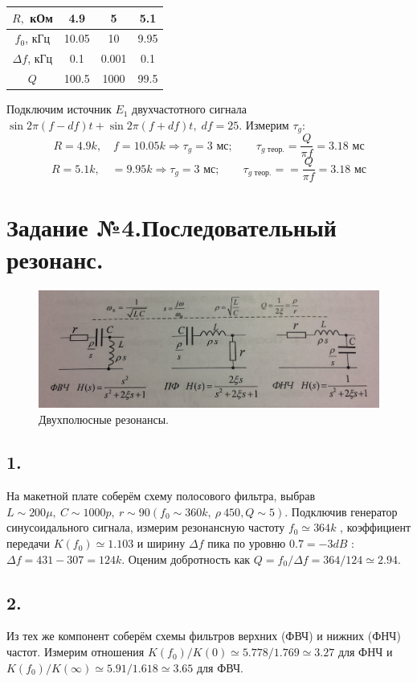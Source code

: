 \documentclass[a4paper, 12pt, twoside]{article}
\begin{document}
\begin{table}[H] 
	\centering 
	\label{table3.1} 
	\begin{tabular}{|c|c|c|c|} \hline 
		$R,$ кОм & 4.9 & 5 & 5.1 \\ \hline 
		$f_0$, кГц & 10.05 & 10 & 9.95 \\ \hline 
		$\Delta f$, кГц & 0.1 & 0.001 & 0.1 \\ \hline 
		$Q$ & 100.5 & 1000 & 99.5 \\ \hline 
	\end{tabular} 
\end{table} 
Подключим источник $E_1$ двухчастотного сигнала $\sin 2\pi(f-df)t+\sin 2\pi(f+df)t,\;df=25$. Измерим $\tau_g$: 
$$R=4.9k,\quad f=10.05k\Rightarrow\tau_g=3\text{ мс};\quad\quad\tau_{g\text{ теор.}}=\frac{Q}{\pi f}=3.18\text{ мс}$$ 
$$R=5.1k,\quad=9.95k\Rightarrow\tau_g=3\text{ мс};\quad\quad\tau_{g\text{ теор.}}==\frac{Q}{\pi f}=3.18\text{ мс}$$

\section*{Задание №4.Последовательный резонанс.}

\begin{figure}[H]
	\includegraphics[width =  0.9\linewidth]{poslrez}
	\caption{Двухполюсные резонансы.}
	
\end{figure}
\subsection*{1.}
На макетной плате соберём схему полосового фильтра, выбрав $L\sim 200\mu, ~ C\sim 1000p,~r\sim 90 (f_0 \sim 360k,~\rho ~ 450, Q\sim 5)$. Подключив генератор синусоидального сигнала, измерим резонансную частоту $f_0 \simeq 364k$ , коэффициент передачи $K(f_0) \simeq 1.103$ и ширину $\Delta f$ пика по уровню $0.7 = -3dB$ : $\Delta f = 431-307 = 124k$. Оценим добротность как $Q = f_0/\Delta f = 364/124 \simeq 2.94$.

\subsection*{2.}
Из тех же компонент соберём схемы фильтров верхних (ФВЧ) и нижних (ФНЧ) частот. Измерим отношения $K(f_0)/K(0) \simeq 5.778/1.769 \simeq 3.27$ для ФНЧ и $K(f_0)/K(\infty)\simeq 5.91/1.618 \simeq 3.65$ для ФВЧ.
\end{document}
